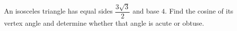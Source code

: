 An isosceles triangle has equal sides $\dfrac{3\sqrt3}{2}$ and base $4$. Find the cosine of its vertex angle and determine whether that angle is acute or obtuse.
